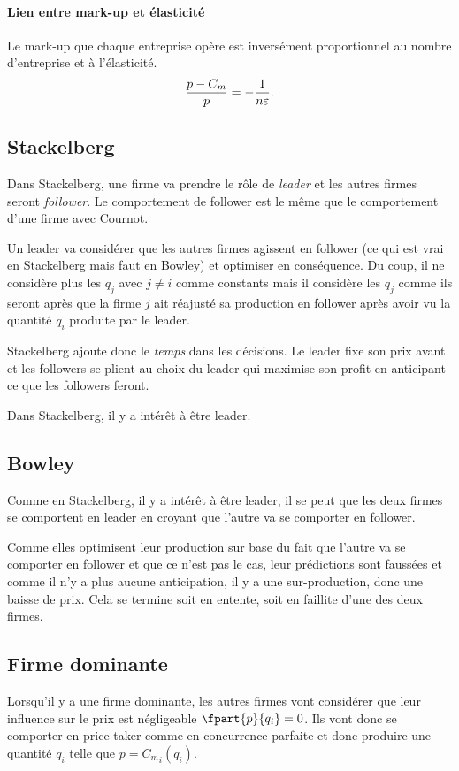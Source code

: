 \paragraph{Lien entre mark-up et élasticité}
Le mark-up que chaque entreprise opère est inversément proportionnel
au nombre d'entreprise et à l'élasticité.
\[ \frac{p-C_m}{p} = -\frac{1}{n\varepsilon}. \]

\subsection{Stackelberg}
Dans Stackelberg, une firme va prendre le rôle de \emph{leader}
et les autres firmes seront \emph{follower}.
Le comportement de follower est le même que le comportement d'une firme
avec Cournot.

Un leader va considérer que les autres firmes agissent en follower
(ce qui est vrai en Stackelberg mais faut en Bowley) et optimiser en
conséquence.
Du coup, il ne considère plus les $q_j$ avec $j \neq i$ comme constants mais
il considère les $q_j$ comme ils seront après que la firme $j$
ait réajusté sa production en follower après avoir vu la quantité $q_i$
produite par le leader.

Stackelberg ajoute donc le \emph{temps} dans les décisions.
Le leader fixe son prix avant et
les followers se plient au choix du leader qui maximise son profit en
anticipant ce que les followers feront.

Dans Stackelberg, il y a intérêt à être leader.

\subsection{Bowley}
Comme en Stackelberg, il y a intérêt à être leader,
il se peut que les deux firmes se comportent en leader
en croyant que l'autre va se comporter en follower.

Comme elles optimisent leur production sur base du fait que l'autre
va se comporter en follower et que ce n'est pas le cas,
leur prédictions sont faussées et comme
il n'y a plus aucune anticipation,
il y a une sur-production, donc une baisse de prix.
Cela se termine soit en entente, soit en faillite d'une des deux firmes.

\subsection{Firme dominante}
Lorsqu'il y a une firme dominante,
les autres firmes vont considérer que leur influence sur le prix
est négligeable $\fpart{p}{q_i} = 0$.
Ils vont donc se comporter en price-taker comme en concurrence parfaite
et donc produire une quantité $q_i$ telle que $p = {C_m}_i(q_i)$.

